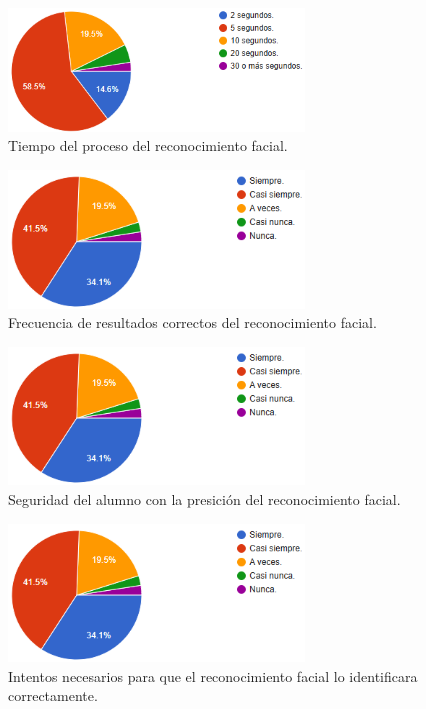 \begin{figure}
	\centering
	\includegraphics[width=0.7\textwidth]{images/TRF.png}
	\caption{Tiempo del proceso del reconocimiento facial.}
	\label{fig:tiempo-RF}
\end{figure}
\begin{figure}
	\centering
	\includegraphics[width=0.7\textwidth]{images/FRF.png}
	\caption{Frecuencia de resultados correctos del reconocimiento facial.}
	\label{fig:FRF}
\end{figure}
\begin{figure}
	\centering
	\includegraphics[width=0.7\textwidth]{images/FRF.png}
	\caption{Seguridad del alumno con la presición del reconocimiento facial.}
	\label{fig:SPRF}
\end{figure}
\begin{figure}
	\centering
	\includegraphics[width=0.7\textwidth]{images/FRF.png}
	\caption{Intentos necesarios para que el reconocimiento facial lo identificara correctamente.}
	\label{fig:IRF}
\end{figure}
